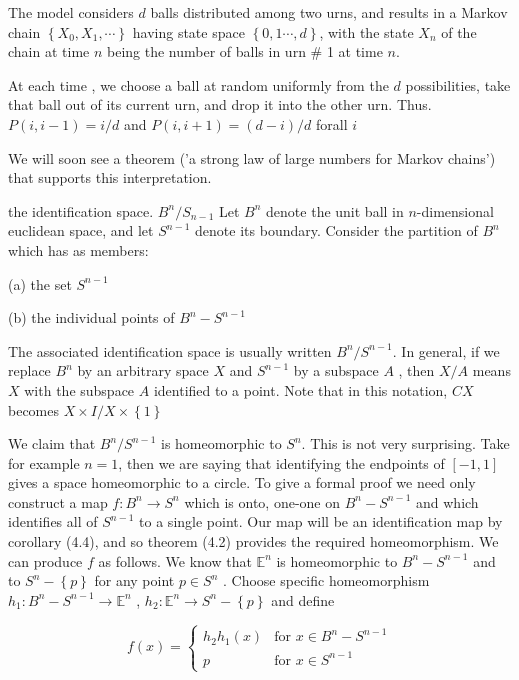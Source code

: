 \documentclass[a4paper, 10pt]{ctexart} %
\begin{document}
 The model considers $d$ balls distributed among two urns, and results in a Markov chain $\left\{X_{0} , X_{1},\cdots \right\}$ having state space $\left\{0 , 1 \cdots  , d \right\}$, with the state $X_{n}$ of the chain at time $n$ being the number of balls in urn \# 1 at time $n$.

 At each time , we choose a ball at random uniformly from the $d$ possibilities, take that ball out of its current urn, and drop it into the other urn. Thus. $P \left(i , i -1\right)  = i / d $ and $P\left( i , i+ 1 \right) = \left(d  -  i \right) / d $ forall $i$

 We will soon see a theorem ('a strong law of large numbers for Markov chains') that supports this interpretation.




 the identification space. $B ^{n} / S_{ n-1}$ Let $B^{n}$ denote the unit ball in $n$-dimensional euclidean space, and let $S^{n-1}$ denote its boundary. Consider the partition of $B^{n}$ which has as members:

 (a) the set $S^{n-1}$

 (b) the individual points of $B^{n} - S^{n-1}$ 

 The associated identification space is usually written $B^{n} / S ^{n-1}$. In general, if we replace $B^{n}$ by an arbitrary space $X$ and $S^{n-1}$ by a subspace $A$ , then $X / A$ means $X$ with the subspace $A$ identified to a point. Note that in this notation, $CX$ becomes $X \times I / X\times \left\{1\right\}$

 We claim that $B^{n} / S^{n-1}$ is homeomorphic to $S^{n}$. This is not very surprising. Take for example $n = 1$, then we are saying that identifying the endpoints of $\left[ -1, 1 \right]$ gives a space homeomorphic to a circle. To give a formal proof we need only construct a map $f : B ^{n} \to S^{n}$ which is onto, one-one on $B ^{n} - S^{n-1}$ and which identifies all of $S^{n-1}$ to a single point. Our map will be an identification map by corollary (4.4), and so theorem (4.2) provides the required homeomorphism. We can produce $f$ as follows. We know that $\mathbb{E} ^{n}$ is homeomorphic to $B^{n}- S^{n-1}$ and to $S^{n} - \left\{p\right\}$ for any point $p \in S^{n}$ . Choose specific homeomorphism $h_1 : B ^{n } - S^{n-1} \to \mathbb{E} ^{n}$ , $h_{2} :\mathbb{E} ^{n} \to S^{n} - \left\{p\right\}$ and define 

 $$f \left(x\right) = \begin{cases} h_2 h_1 \left(x\right) & \text{for }  x \in B^{n} - S^{n-1}\\ p & \text{for } x \in S^{n-1} \end{cases} $$
\end{document}
